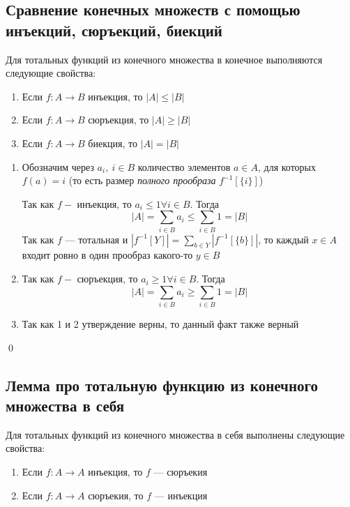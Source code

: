 \documentclass[a4paper]{article}
\begin{document}
\subsection{Сравнение конечных множеств с помощью инъекций, сюръекций, биекций}
\theorem Для тотальных функций из конечного множества в конечное выполняются следующие свойства:
\begin{enumerate}
    \item Если $f: A\rightarrow B$ инъекция, то $|A|\leqslant|B|$
    \item Если $f: A\rightarrow B$ сюръекция, то $|A|\geqslant|B|$
    \item Если $f: A\rightarrow B$ биекция, то $|A|=|B|$
\end{enumerate}

\proof
\begin{enumerate}
    \item Обозначим через $a_i,\ i\in B$ количество элементов $a\in A$, для которых $f(a)=i$ (то есть размер \textit{полного прообраза} $f^{-1}[\{i\}]$)
    
    Так как $f-$ инъекция, то $a_i\leqslant1\forall i\in B$. Тогда
    \begin{equation*}
        |A|=\sum\limits_{i\in B} a_i\leqslant\sum\limits_{i\in B} 1=|B|
    \end{equation*}
    Так как $f$ — тотальная и $|f^{-1}[Y]|=\sum\limits_{b\in Y} |f^{-1}[\{b\}]|$, то каждый $x\in A$ входит ровно в один прообраз какого-то $y\in B$
    
    \item Так как $f-$ сюръекция, то $a_i\geqslant1\forall i\in B$. Тогда
    \begin{equation*}
        |A|=\sum\limits_{i\in B} a_i\geqslant\sum\limits_{i\in B} 1=|B|
    \end{equation*}
     
    \item Так как 1 и 2 утверждение верны, то данный факт также верный
\end{enumerate}\qed

\subsection{Лемма про тотальную функцию из конечного множества в себя}
\theorem Для тотальных функций из конечного множества в себя выполнены следующие свойства:
\begin{enumerate}
    \item Если $f: A\rightarrow A$ инъекция, то $f$ — сюръекия
    \item Если $f: A\rightarrow A$ сюръекия, то $f$ — инъекция
\end{enumerate}
\end{document}
